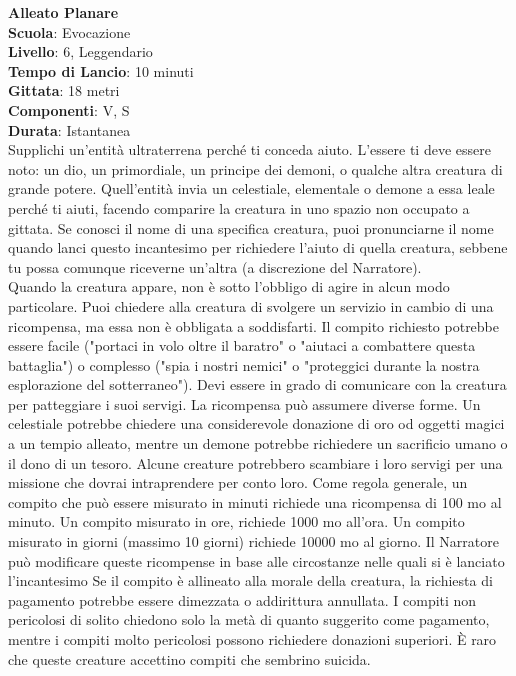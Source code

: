 \begin{multicols}{2}

\medskip\textbf{Alleato Planare}\\
\textbf{Scuola}: Evocazione\\
\textbf{Livello}: 6, Leggendario\\
\textbf{Tempo di Lancio}: 10 minuti\\
\textbf{Gittata}: 18 metri\\
\textbf{Componenti}: V, S\\
\textbf{Durata}: Istantanea\\
Supplichi un'entità ultraterrena perché ti conceda aiuto. L'essere ti deve essere noto: un dio, un primordiale, un principe dei demoni, o qualche altra creatura di grande potere. Quell'entità invia un celestiale, elementale o demone a essa leale perché ti aiuti, facendo comparire la creatura in uno spazio non occupato a gittata. Se conosci il nome di una specifica creatura, puoi pronunciarne il nome quando lanci questo incantesimo per richiedere l'aiuto di quella creatura, sebbene tu possa comunque riceverne un'altra (a discrezione del Narratore).\\
Quando la creatura appare, non è sotto l'obbligo di agire in alcun modo particolare. Puoi chiedere alla creatura di svolgere un servizio in cambio di una ricompensa, ma essa non è obbligata a soddisfarti. Il compito richiesto potrebbe essere facile ("portaci in volo oltre il baratro" o "aiutaci a combattere questa battaglia") o complesso ("spia i nostri nemici" o "proteggici durante la nostra esplorazione del sotterraneo"). Devi essere in grado di comunicare con la creatura per patteggiare i suoi servigi. La ricompensa può assumere diverse forme. Un celestiale potrebbe chiedere una considerevole donazione di oro od oggetti magici a un tempio alleato, mentre un demone potrebbe richiedere un sacrificio umano o il dono di un tesoro. Alcune creature potrebbero scambiare i loro servigi per una missione che dovrai intraprendere per conto loro. Come regola generale, un compito che può essere misurato in minuti richiede una ricompensa di 100 mo al minuto. Un compito misurato in ore, richiede 1000 mo all'ora. Un compito misurato in giorni (massimo 10 giorni) richiede 10000 mo al giorno. Il Narratore può modificare queste ricompense in base alle circostanze nelle quali si è lanciato l'incantesimo Se il compito è allineato alla morale della creatura, la richiesta di pagamento potrebbe essere dimezzata o addirittura annullata. I compiti non pericolosi di solito chiedono solo la metà di quanto suggerito come pagamento, mentre i compiti molto pericolosi possono richiedere donazioni superiori. È raro che queste creature accettino compiti che sembrino suicida.\\

\end{multicols}
